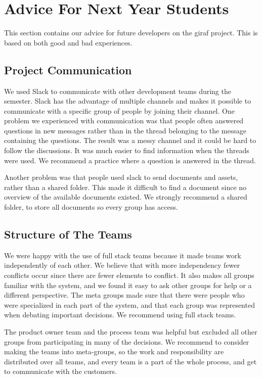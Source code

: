 \section{Advice For Next Year Students}

This section contains our advice for future developers on the \gls{giraf} project. This is based on both good and bad experiences.

\subsection{Project Communication}

We used Slack to communicate with other development teams during the semester. Slack has the advantage of multiple channels and makes it possible to communicate with a specific group of people by joining their channel. One problem we experienced with communication was that people often answered questions in new messages rather than in the thread belonging to the message containing the questions. The result was a messy channel and it could be hard to follow the discussions. It was much easier to find information when the threads were used. We recommend a practice where a question is answered in the thread.

Another problem was that people used slack to send documents and assets, rather than a shared folder. This made it difficult to find a document since no overview of the available documents existed. We strongly recommend a shared folder, to store all documents so every group has access.

\subsection{Structure of The Teams}

We were happy with the use of full stack teams because it made teams work independently of each other. We believe that with more independency fewer conflicts occur since there are fewer elements to conflict. It also makes all groups familiar with the system, and we found it easy to ask other groups for help or a different perspective. The meta groups made sure that there were people who were specialized in each part of the system, and that each group was represented when debating important decisions. We recommend using full stack teams.

The product owner team and the process team was helpful but excluded all other groups from participating in many of the decisions. We recommend to consider making the teams into meta-groups, so the work and responsibility are distributed over all teams, and every team is a part of the whole process, and get to communicate with the customers.

